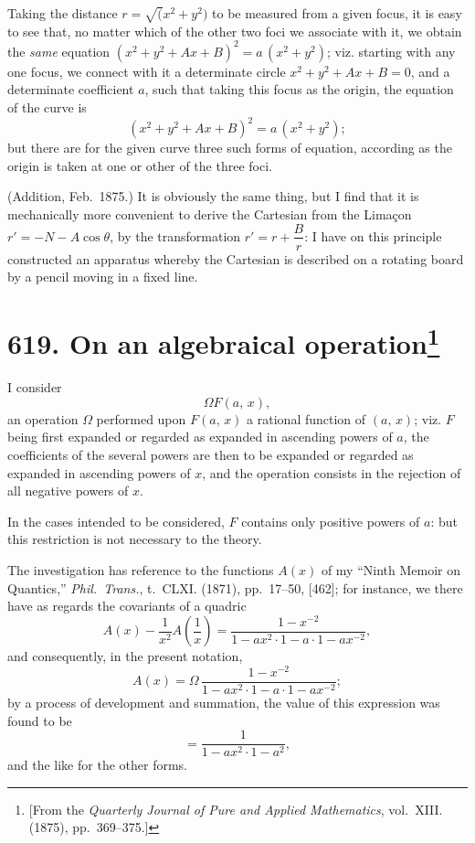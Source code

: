 \documentclass[11pt,a4paper]{article}
\theoremstyle{plain}
\theoremstyle{definition}
\theoremstyle{remark}
\begin{document}
Taking the distance $r = \surd(x^2+y^2)$ to be measured from a given focus, it is easy to see that, no matter which of the other two foci we associate with it, we obtain the \textit{same} equation $(x^2 + y^2 + Ax + B)^2 = a\,(x^2 + y^2)$; viz. starting with any one focus, we connect with it a determinate circle $x^2 + y^2 + Ax + B = 0$, and a determinate coefficient $a$, such that taking this focus as the origin, the equation of the curve is
\[
(x^2 + y^2 + Ax + B)^2 = a\,(x^2 + y^2);
\]
but there are for the given curve three such forms of equation, according as the origin is taken at one or other of the three foci.

(Addition, Feb.~1875.) It is obviously the same thing, but I find that it is mechanically more convenient to derive the Cartesian from the Lima\c{c}on $r' = -N - A\cos\theta$, by the transformation $r' = r + \dfrac{B}{r}$: I have on this principle constructed an apparatus whereby the Cartesian is described on a rotating board by a pencil moving in a fixed line.

\newpage
\section[On an algebraical operation]{\textbf{619.} On an algebraical operation\footnote{[From the \textit{Quarterly Journal of Pure and Applied Mathematics}, vol.~XIII. (1875), pp.~369--375.]}}

I consider
\[
\Omega F(a,\, x),
\]
an operation $\Omega$ performed upon $F(a,\, x)$ a rational function of $(a,\, x)$; viz. $F$ being first expanded or regarded as expanded in ascending powers of $a$, the coefficients of the several powers are then to be expanded or regarded as expanded in ascending powers of $x$, and the operation consists in the rejection of all negative powers of $x$.

In the cases intended to be considered, $F$ contains only positive powers of $a$: but this restriction is not necessary to the theory.

The investigation has reference to the functions $A(x)$ of my ``Ninth Memoir on Quantics,'' \textit{Phil.~Trans.}, t.~CLXI. (1871), pp.~17--50, [462]; for instance, we there have as regards the covariants of a quadric
\[
A(x) - \frac{1}{x^2}A\left(\frac{1}{x}\right) = \frac{1 - x^{-2}}{1 - ax^2 \cdot 1 - a \cdot 1 - ax^{-2}},
\]
and consequently, in the present notation,
\[
A(x) = \Omega\,\frac{1 - x^{-2}}{1 - ax^2 \cdot 1 - a \cdot 1 - ax^{-2}};
\]
by a process of development and summation, the value of this expression was found to be
\[
= \frac{1}{1 - ax^2 \cdot 1 - a^2},
\]
and the like for the other forms.
\end{document}
